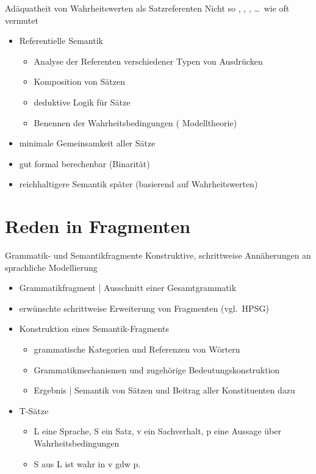 \begin{frame}
  {Adäquatheit von Wahrheitswerten als Satzreferenten}
  \onslide<+->
  \onslide<+->
  Nicht so , , , \ldots\ wie oft vermutet\\
  \Zeile
  \begin{itemize}[<+->]
    \item Referentielle Semantik
      \begin{itemize}[<+->]
        \item Analyse der Referenten verschiedener Typen von Ausdrücken
        \item Komposition von Sätzen
        \item deduktive Logik für Sätze
        \item \alert{Benennen der Wahrheitsbedingungen} ( Modelltheorie)
      \end{itemize}
      \Halbzeile
    \item minimale Gemeinsamkeit \alert{aller} Sätze
    \item gut formal berechenbar (Binarität)
    \item reichhaltigere Semantik später (basierend auf Wahrheitswerten)
  \end{itemize}
\end{frame}

\section{Reden in Fragmenten}

\begin{frame}
  {Grammatik- und Semantikfragmente}
  \onslide<+->
  \onslide<+->
  \alert{Konstruktive}, \alert{schrittweise} Annäherungen an sprachliche Modellierung\\
  \Zeile
  \begin{itemize}[<+->]
    \item Grammatikfragment | Ausschnitt einer Gesamtgrammatik
    \item erwünschte schrittweise Erweiterung von Fragmenten (vgl.\ HPSG)
      \Zeile
    \item Konstruktion eines Semantik-Fragments
      \begin{itemize}[<+->]
         \item grammatische Kategorien und Referenzen von Wörtern
         \item Grammatikmechanismen und zugehörige Bedeutungskonstruktion
         \item Ergebnis | Semantik von Sätzen und Beitrag aller Konstituenten dazu
      \end{itemize}
    \item \Halbzeile
      \alert{T-Sätze}
      \begin{itemize}[<+->]
        \item \alert{L} eine Sprache, \alert{S} ein Satz, \alert{v} ein Sachverhalt, \alert{p} eine Aussage über Wahrheitsbedingungen
        \item \alert{S aus L ist wahr in v gdw p.}
      \end{itemize}
  \end{itemize}
\end{frame}

